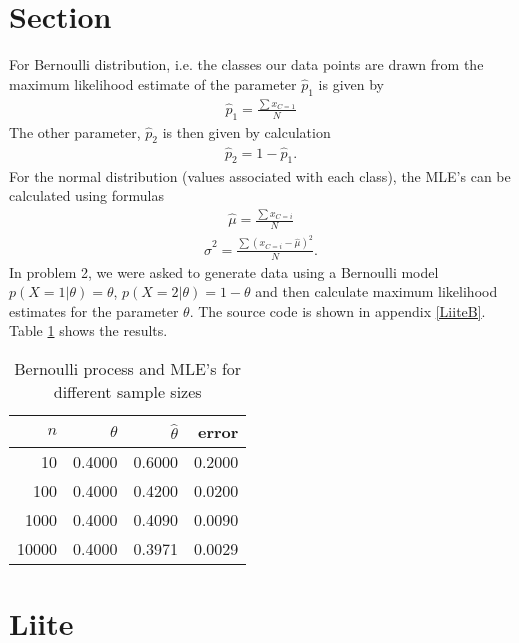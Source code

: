 \documentclass[a4paper,10pt]{scrartcl}
\author{Sakari Cajanus}
\begin{document}
\maketitlepage
\section{Section}
For Bernoulli distribution, i.e. the classes our data points are drawn from the maximum likelihood estimate of the parameter $\hat p_1$ is given by
\begin{align*}
    \hat p_1 = \frac{\sum x_{C=1}}{N}
\end{align*}
The other parameter, $\hat p_2$ is then given by calculation
\begin{align*}
    \hat p_2 = 1 - \hat p_1.
\end{align*}
For the normal distribution (values associated with each class), the MLE's can be calculated using formulas
\begin{align*}
    \hat \mu = \frac{\sum x_{C=i}}{N}
\end{align*}
\begin{align*}
    \hat \sigma^2 = \frac{\sum (x_{C=i}-\hat \mu)^2}{N}.
\end{align*}
In problem 2, we were asked to generate data using a Bernoulli model $p(X=1 |
\theta) = \theta$, $p(X=2 | \theta)=1-\theta$ and then calculate maximum
likelihood estimates for the parameter $\theta$. The source code is shown
in appendix \ref{LiiteB}. Table \ref{tab:bernoulli} shows the results.
\begin{table}[ht]
	\caption{Bernoulli process and MLE's for different sample sizes\vspace{2pt}}
	\label{tab:bernoulli}
	\centering
	\begin{tabular}{rrrr}
		\toprule
		$n$ & $\theta$ & $\hat\theta$ & error \\
		\hline
10        &  0.4000  &  0.6000 & 0.2000 \\
100       &  0.4000  &  0.4200 & 0.0200 \\
1000      &  0.4000  &  0.4090 & 0.0090 \\
10000     &  0.4000  &  0.3971 & 0.0029 \\
		\bottomrule
	\end{tabular}
\end{table}
\clearpage
\appendix
\section{Liite\label{LiiteB}}
\end{document}
